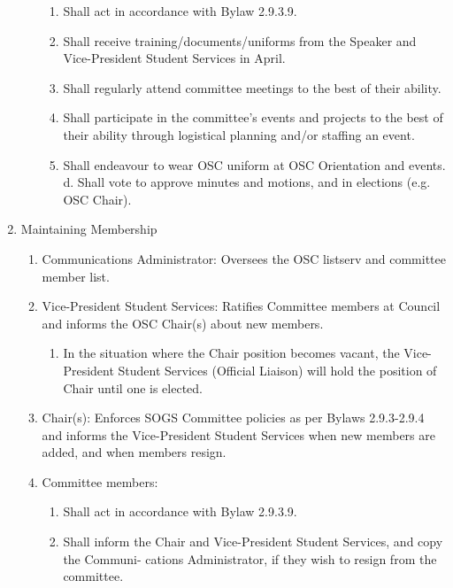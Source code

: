 \begin{enumerate}[label*=\arabic*., align=left]
\begin{enumerate}[label*=\arabic*., align=left]
\begin{enumerate}
\item Shall act in accordance with Bylaw 2.9.3.9.
\item Shall receive training/documents/uniforms from the Speaker and Vice-President Student Services in April.
\item Shall regularly attend committee meetings to the best of their ability.
\item Shall participate in the committee's events and projects to the best of their ability through
logistical planning and/or staffing an event.
\item Shall endeavour to wear OSC uniform at OSC Orientation and events. d. Shall vote to approve minutes and motions, and in elections (e.g. OSC Chair).
\end{enumerate}

\end{enumerate}
\item Maintaining Membership
\begin{enumerate}[label*=\arabic*., align=left]	
\item Communications Administrator: Oversees the OSC listserv and committee member list.
\item Vice-President Student Services: Ratifies Committee members at Council and informs the
OSC Chair(s) about new members.
\begin{enumerate}
\item In the situation where the Chair position becomes vacant, the Vice-President Student Services (Official Liaison) will hold the position of Chair until one is elected.
\end{enumerate}
\item Chair(s): Enforces SOGS Committee policies as per Bylaws 2.9.3-2.9.4 and informs the Vice-President Student Services when new members are added, and when members resign.
\item Committee members:
\begin{enumerate}
\item Shall act in accordance with Bylaw 2.9.3.9.
\item Shall inform the Chair and Vice-President Student Services, and copy the
Communi- cations Administrator, if they wish to resign from the committee.
\end{enumerate}
\end{enumerate}
\end{enumerate}

